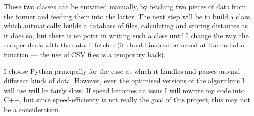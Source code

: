 \documentclass[a4paper,11pt,twoside,notitlepage]{article}
\begin{document}
        These two classes can be entwined manually, by fetching two
        pieces of data from the former and feeding them into the
        latter. The next step will be to build a class which
        autmatically builds a database of files, calculating and storing
        distances as it does so, but there is no point in writing such
        a class until I change the way the scraper deals with the data
        it fetches (it should instead returned at the end of a
        function --- the use of CSV files is a temporary hack).

        I choose Python principally for the ease at which it handles
        and passes around different kinds of data. However, even the
        optimised versions of the algorithms I will use will be fairly
        slow. If speed becomes an issue I will rewrite my code into
        C++, but since speed-efficiency is not really the goal of this
        project, this may not be a consideration.

        \printbibliography        
\end{document}
